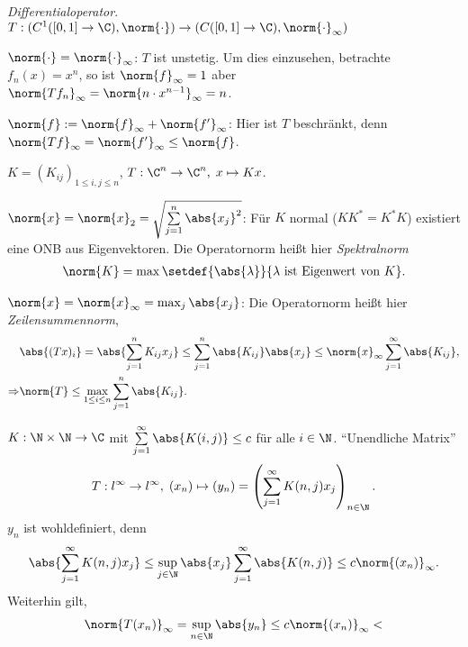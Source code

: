 \begin{bsp}
\begin{bspenum}
\item \textit{Differentialoperator}. $T:(C^1([0,1]\to\C),\norm{\cdot}) \to
(C([0,1]\to \C),\norm{\cdot}_\infty)$
\begin{propenum}
  \item $\norm{\cdot}=\norm{\cdot}_\infty$: $T$ ist unstetig. Um dies
  einzusehen, betrachte $f_n(x)=x^n$, so ist $\norm{f}_\infty = 1$ aber
  $\norm{Tf_n}_\infty = \norm{n\cdot x^{n-1}}_\infty = n$.
  \item $\norm{f}:=\norm{f}_\infty+\norm{f'}_\infty$: Hier ist 
 $T$ beschränkt, denn $\norm{Tf}_\infty = \norm{f'}_\infty \le \norm{f}$.
\end{propenum}
\item $K=(K_{ij})_{1\le i,j\le n}$, $T:\C^n\to \C^n,\; x\mapsto Kx$.
\begin{propenum}
  \item $\norm{x}=\norm{x}_2 = \sqrt{\sum\limits_{j=1}^n \abs{x_j}^2}$: Für $K$
  normal ($KK^* = K^*K$) existiert eine ONB aus Eigenvektoren. Die Operatornorm
  heißt hier \emph{Spektralnorm}
\begin{align*}
\norm{K} = \max\setdef{\abs{\lambda}}{\lambda\text{ ist
  Eigenwert von }K}.
\end{align*}
\item $\norm{x}=\norm{x}_\infty = \max_j \abs{x_j}$: Die Operatornorm heißt
hier \emph{Zeilensummennorm},
\begin{align*}
&\abs{(Tx)_i} = \abs{\sum\limits_{j=1}^n K_{ij}x_j} \le \sum\limits_{j=1}^n
\abs{K_{ij}}\abs{x_j} \le \norm{x}_\infty \sum\limits_{j=1}^\infty
\abs{K_{ij}},\\
\Rightarrow & \norm{T} \le \max\limits_{1\le i\le n}
\sum\limits_{j=1}^n\abs{K_{ij}}.
\end{align*}
\end{propenum}
\item $K:\N\times\N \to \C$ mit $\sum\limits_{j=1}^\infty \abs{K(i,j)} \le c$
für alle $i\in\N$. ``Unendliche Matrix''
\begin{align*}
T: l^\infty \to l^\infty,\; (x_n)\mapsto (y_n) = \left(\sum\limits_{j=1}^\infty
K(n,j)x_j \right)_{n\in\N}.
\end{align*}
$y_n$ ist wohldefiniert, denn
\begin{align*}
\abs{\sum\limits_{j=1}^\infty K(n,j)x_j } \le \sup\limits_{j\in\N} \abs{x_j}
\sum\limits_{j=1}^\infty \abs{K(n,j)} \le c \norm{(x_n)}_\infty.
\end{align*}
Weiterhin gilt,
\begin{align*}
\norm{T(x_n)}_\infty = \sup\limits_{n\in\N} \abs{y_n} \le c\norm{(x_n)}_\infty <

\end{align*}
\end{bspenum}
\end{bsp}
